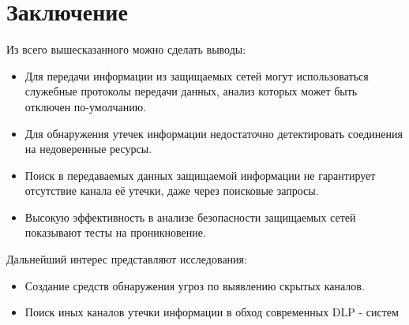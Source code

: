 \chapter*{Заключение}

Из всего вышесказанного можно сделать выводы:

\begin{itemize}
	\item
		Для передачи информации из защищаемых сетей могут использоваться служебные протоколы передачи данных, анализ которых может быть отключен по-умолчанию.
	\item
		Для обнаружения утечек информации недостаточно детектировать соединения на недоверенные ресурсы.
	\item
		Поиск в передаваемых данных защищаемой информации не гарантирует отсутствие канала её утечки, даже через поисковые запросы.
	\item
		Высокую эффективность в анализе безопасности защищаемых сетей показывают тесты на проникновение.
\end{itemize}

Дальнейший интерес представляют исследования:

\begin{itemize}
    \item
        Создание средств обнаружения угроз по выявлению скрытых каналов.

    \item
        Поиск иных каналов утечки информации в обход современных DLP - систем

\end{itemize}
